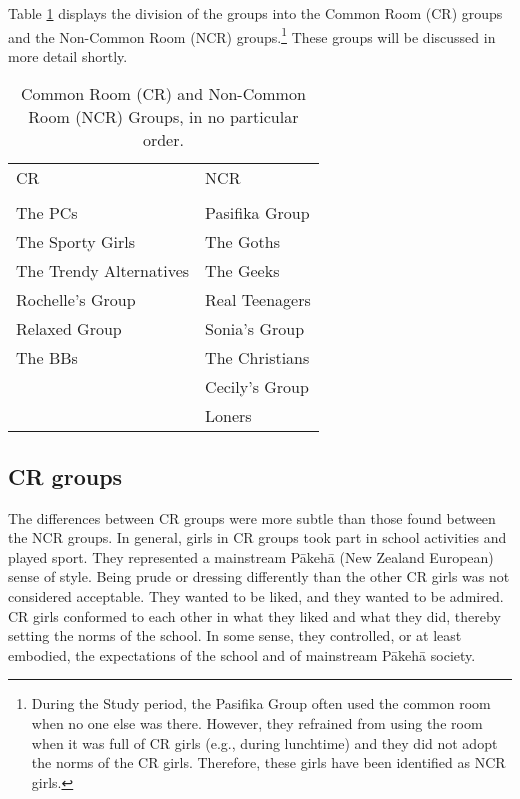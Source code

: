 
Table \ref{CRNCR} displays the division of the groups into the Common Room (CR) groups and the Non-Common Room (NCR) groups.\footnote{During the Study period, the Pasifika Group often used the common room when no one else was there.  However, they refrained from using the room when it was full of CR girls (e.g., during lunchtime) and they did not adopt the norms of the CR girls. Therefore, these girls have been identified as NCR girls.}  These groups will be discussed in more detail shortly.

     
     
\begin{table}[htbp]
\caption{Common Room (CR) and Non-Com\-mon Room (NCR) Groups, in no parti\-cular order.}\label{CRNCR}
	 \begin{center}
		\begin{tabular}{ll}\hline
	
CR&NCR\\
	\\ \hline
The PCs&Pasifika Group\\
The Sporty Girls&The Goths\\
The Trendy Alternatives&The Geeks\\
Rochelle's Group&Real Teenagers\\
Relaxed Group&Sonia's Group\\
The BBs&The Christians\\
 & Cecily's Group \\
 & Loners \\

\hline
		\end{tabular}
	
	\end{center}
\end{table} 

\subsection{CR groups}
\label{group:CR}

The differences between CR groups were more subtle than those found between the NCR groups.  In general, girls in CR groups took part in school activities and played sport.  They represented a mainstream P\=akeh\=a (New Zealand European) sense of style.  Being prude or dressing differently than the other CR girls was not considered acceptable. They wanted to be liked, and they wanted to be admired.  CR girls conformed to each other in what they liked and what they did, thereby setting the norms of the school.  In some sense, they controlled, or at least embodied, the expectations of the school and of mainstream P\=akeh\=a society.

